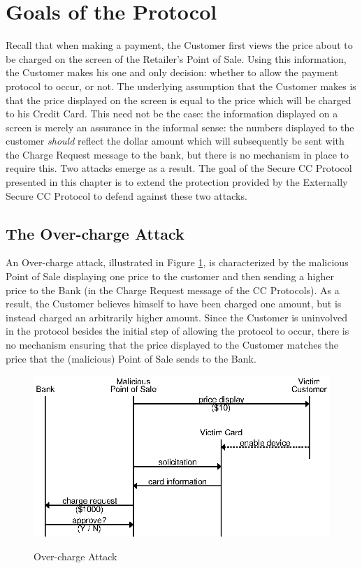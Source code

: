 \section{Goals of the Protocol}
\label{sec:secure-goals}

Recall that when making a payment, the Customer first views the price about to be charged on the screen of the Retailer's Point of Sale.
Using this information, the Customer makes his one and only decision: whether to allow the payment protocol to occur, or not.
The underlying assumption that the Customer makes is that the price displayed on the screen is equal to the price which will be charged to his Credit Card.
This need not be the case: the information displayed on a screen is merely an assurance in the informal sense:
	the numbers displayed to the customer \emph{should} reflect the dollar amount which will subsequently be sent with the Charge Request message to the bank,
    but there is no mechanism in place to require this.
Two attacks emerge as a result.
The goal of the Secure CC Protocol presented in this chapter is to extend the protection provided by the Externally Secure CC Protocol to defend against these two attacks.

\subsection{The Over-charge Attack}

An Over-charge attack, illustrated in Figure \ref{fig:attack_overcharge}, is characterized by the malicious Point of Sale displaying one price to the customer
	and then sending a higher price to the Bank
	(in the Charge Request message of the CC Protocols).
As a result, the Customer believes himself to have been charged one amount, but is instead charged an arbitrarily higher amount.
Since the Customer is uninvolved in the protocol besides the initial step of allowing the protocol to occur,
	there is no mechanism ensuring that the price displayed to the Customer matches the price that the (malicious) Point of Sale sends to the Bank.

\begin{figure}
  \caption{Over-charge Attack}
  \centering
    \includegraphics{img/attack-mr-overcharge.eps}
  \label{fig:attack_overcharge}
\end{figure}

